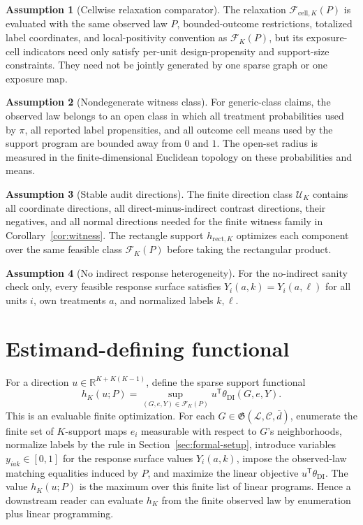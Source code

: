 \documentclass[11pt]{article}
\newcommand{\transpose}{\mathsf{T}}
\theoremstyle{definition}
\newtheorem{assumption}{Assumption}
\theoremstyle{plain}
\theoremstyle{remark}
\begin{document}
\begin{assumption}[Cellwise relaxation comparator]\label{ass:cellwise}
The relaxation \(\mathcal F_{\mathrm{cell},K}(P)\) is evaluated with the same observed law \(P\), bounded-outcome restrictions, totalized label coordinates, and local-positivity convention as \(\mathcal F_K(P)\), but its exposure-cell indicators need only satisfy per-unit design-propensity and support-size constraints.  They need not be jointly generated by one sparse graph or one exposure map.
\end{assumption}

\begin{assumption}[Nondegenerate witness class]\label{ass:nondegenerate}
For generic-class claims, the observed law belongs to an open class in which all treatment probabilities used by \(\pi\), all reported label propensities, and all outcome cell means used by the support program are bounded away from \(0\) and \(1\).  The open-set radius is measured in the finite-dimensional Euclidean topology on these probabilities and means.
\end{assumption}

\begin{assumption}[Stable audit directions]\label{ass:audit}
The finite direction class \(\mathcal U_K\) contains all coordinate directions, all direct-minus-indirect contrast directions, their negatives, and all normal directions needed for the finite witness family in Corollary~\ref{cor:witness}.  The rectangle support \(h_{\mathrm{rect},K}\) optimizes each component over the same feasible class \(\mathcal F_K(P)\) before taking the rectangular product.
\end{assumption}

\begin{assumption}[No indirect response heterogeneity]\label{ass:no-indirect}
For the no-indirect sanity check only, every feasible response surface satisfies \(Y_i(a,k)=Y_i(a,\ell)\) for all units \(i\), own treatments \(a\), and normalized labels \(k,\ell\).
\end{assumption}

\section{Estimand-defining functional}
\label{sec:functional}
For a direction \(u\in\mathbb R^{K+K(K-1)}\), define the sparse support functional
\[
h_K(u;P)=\sup_{(G,e,Y)\in\mathcal F_K(P)}u^\transpose\theta_{\mathrm{DI}}(G,e,Y).
\]
This is an evaluable finite optimization.  For each \(G\in\mathfrak G(\mathcal L,\mathcal C,\bar d)\), enumerate the finite set of \(K\)-support maps \(e_i\) measurable with respect to \(G\)'s neighborhoods, normalize labels by the rule in Section~\ref{sec:formal-setup}, introduce variables \(y_{iak}\in[0,1]\) for the response surface values \(Y_i(a,k)\), impose the observed-law matching equalities induced by \(P\), and maximize the linear objective \(u^\transpose\theta_{\mathrm{DI}}\).  The value \(h_K(u;P)\) is the maximum over this finite list of linear programs.  Hence a downstream reader can evaluate \(h_K\) from the finite observed law by enumeration plus linear programming.
\end{document}
